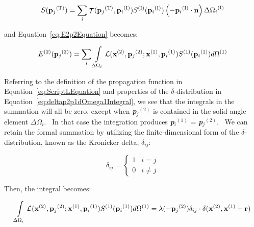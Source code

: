 \begin{equation}
S({{\bf{p}}_j}^{{\rm{(T)}}}) = \sum\limits_i {{\mathop{\rm \mathcal{T}}\nolimits} ({{\bf{p}}_j}^{{\rm{(T)}}},{{\bf{p}}_i}^{{\rm{(I)}}}){S^{{\rm{(I)}}}}({{\bf{p}}_i}^{{\rm{(I)}}})\left( { - {{\bf{p}}_i}^{{\rm{(I)}}}\cdot {\bf{n}}} \right)\Delta {\Omega_i}^{{\rm{(I)}}}}
\label{eq:SofptotheTmodifiedEquation}
\end{equation}

and Equation~\ref{eq:E2p2Equation} becomes:

\begin{equation}
{E^{(2)}}({{\bf{p}}_j}^{{\rm{(2)}}}) = \sum\limits_i {\int\limits_{\Delta {\Omega_i}} {\mathcal{L}({{\bf{x}}^{{\rm{(2)}}}},{{\bf{p}}_j}^{{\rm{(2)}}};{{\bf{x}}^{{\rm{(1)}}}},{{\bf{p}}_i}^{{\rm{(1)}}}){S^{{\rm{(1)}}}}({{\bf{p}}_i}^{{\rm{(1)}}})d{\Omega ^{{\rm{(1)}}}}} }
\end{equation}

Referring to the definition of the propagation function in Equation~\ref{eq:ScriptLEquation} and properties of the \(\delta\)-distribution in Equation~\ref{eq:deltap2p1dOmega1Integral}, we see that the integrals in the summation will all be zero, except when \textbf{\emph{p}}\emph{\(_{j}\)}\(^{(2)}\) is contained in the solid angle element \(\Delta\)\(\Omega\)\emph{\(_{i}\)}.~ In that case the integration produces \textbf{\emph{p}}\emph{\(_{i}\)}\(^{(1)}\) = \textbf{\emph{p}}\emph{\(_{j}\)}\(^{(2)}\).~ We can retain the formal summation by utilizing the finite-dimensional form of the \(\delta\)-distribution, known as the Kronicker delta, \(\delta\)\emph{\(_{ij}\)}:

\begin{equation}
{\delta_{ij}} = \left\{ {\begin{array}{*{20}{c}}1&{i = j}\\0&{i \ne j}\end{array}} \right.
\end{equation}

Then, the integral becomes:

\begin{equation}
\int\limits_{\Delta {\Omega_i}} {\mathcal{L}({{\bf{x}}^{{\rm{(2)}}}},{{\bf{p}}_j}^{{\rm{(2)}}};{{\bf{x}}^{{\rm{(1)}}}},{{\bf{p}}_i}^{{\rm{(1)}}}){S^{{\rm{(1)}}}}({{\bf{p}}_i}^{{\rm{(1)}}})d{\Omega ^{{\rm{(1)}}}}}  = \lambda ( - {{\bf{p}}_j}^{{\rm{(2)}}}){\delta_{ij}} \cdot \delta ({{\bf{x}}^{{\rm{(2)}}}},{{\bf{x}}^{{\rm{(1)}}}} + {\bf{r}})
\label{eq:ScriptLx2pj2x1pi1S1pi1Integral}
\end{equation}

